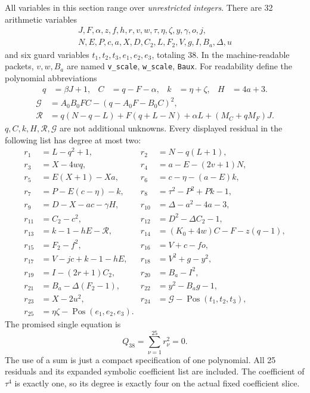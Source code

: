 \documentclass[11pt]{article}
\theoremstyle{definition}\newtheorem{definition}[theorem]{Definition}
\theoremstyle{remark}\newtheorem{remark}[theorem]{Remark}
\newcommand{\Pos}{\operatorname{Pos}}
\newcommand{\PhiG}{\mathcal G}
\begin{document}
All variables in this section range over \emph{unrestricted integers}.
There are 32 arithmetic variables
\[
\begin{gathered}
 J,F,\alpha,z,f,h,r,v,w,\tau,\eta,\zeta,y,\gamma,o,j,\\
 N,E,P,c,a,X,D,C_2,L,F_2,V,g,I,B_a,\Delta,u
\end{gathered}
\]
and six guard variables $t_1,t_2,t_3,e_1,e_2,e_3$, totaling 38.
In the machine-readable packets, $v,w,B_a$ are named
\texttt{v\_scale}, \texttt{w\_scale}, \texttt{Baux}.
For readability define the polynomial abbreviations
\begin{align*}
 q&=\beta J+1,&C&=q-F-\alpha,&k&=\eta+\zeta,&H&=4a+3.
\end{align*}
\begin{align*}
 \PhiG&=A_0B_0FC-(q-A_0F-B_0C)^2,\\
 \mathcal R&=q(N-q-L)+F(q+L-N)+\alpha L+(M_C+qM_F)J.
\end{align*}
$q,C,k,H,\mathcal R,\PhiG$ are not additional unknowns.
Every displayed residual in the following list has degree at most two:
\begin{align*}
 r_1&=L-q^2+1,&r_2&=N-q(L+1),\\
 r_3&=X-4wq,&r_4&=a-E-(2v+1)N,\\
 r_5&=E(X+1)-Xa,&r_6&=c-\eta-(a-E)k,\\
 r_7&=P-E(c-\eta)-k,&r_8&=\tau^2-P^2+Pk-1,\\
 r_9&=D-X-ac-\gamma H,&r_{10}&=\Delta-a^2-4a-3,\\
 r_{11}&=C_2-c^2,&r_{12}&=D^2-\Delta C_2-1,\\
 r_{13}&=k-1-hE-\mathcal R,&
 r_{14}&=(K_0+4w)C-F-z(q-1),\\
 r_{15}&=F_2-f^2,&r_{16}&=V+c-fo,\\
 r_{17}&=V-jc+k-1-hE,&r_{18}&=V^2+g-y^2,\\
 r_{19}&=I-(2r+1)C_2,&r_{20}&=B_a-I^2,\\
 r_{21}&=B_a-\Delta(F_2-1),&r_{22}&=y^2-B_ag-1,\\
 r_{23}&=X-2u^2,&r_{24}&=\PhiG-\Pos(t_1,t_2,t_3),\\
 r_{25}&=\eta\zeta-\Pos(e_1,e_2,e_3).&&
\end{align*}
The promised single equation is
\begin{equation}\label{eq:Q38}
 \boxed{Q_{38}=\sum_{\nu=1}^{25}r_\nu^2=0.}
\end{equation}
The use of a sum is just a compact specification of one polynomial.
All 25 residuals and its expanded symbolic coefficient list are included.
The coefficient of $\tau^4$ is exactly one, so its degree is exactly four
on the actual fixed coefficient slice.
\end{document}

